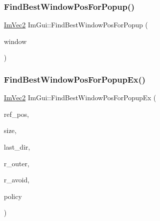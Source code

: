 \subsubsection{\texorpdfstring{Find\+Best\+Window\+Pos\+For\+Popup()}{FindBestWindowPosForPopup()}}
{\footnotesize\ttfamily \hyperlink{structImVec2}{Im\+Vec2} Im\+Gui\+::\+Find\+Best\+Window\+Pos\+For\+Popup (\begin{DoxyParamCaption}\item[{\hyperlink{structImGuiWindow}{Im\+Gui\+Window} $\ast$}]{window }\end{DoxyParamCaption})}

\mbox{\label{namespaceImGui_ab4a820eead6cd418d7be66e142bf3478}} 
\subsubsection{\texorpdfstring{Find\+Best\+Window\+Pos\+For\+Popup\+Ex()}{FindBestWindowPosForPopupEx()}}
{\footnotesize\ttfamily \hyperlink{structImVec2}{Im\+Vec2} Im\+Gui\+::\+Find\+Best\+Window\+Pos\+For\+Popup\+Ex (\begin{DoxyParamCaption}\item[{const \hyperlink{structImVec2}{Im\+Vec2} \&}]{ref\+\_\+pos,  }\item[{const \hyperlink{structImVec2}{Im\+Vec2} \&}]{size,  }\item[{Im\+Gui\+Dir $\ast$}]{last\+\_\+dir,  }\item[{const \hyperlink{structImRect}{Im\+Rect} \&}]{r\+\_\+outer,  }\item[{const \hyperlink{structImRect}{Im\+Rect} \&}]{r\+\_\+avoid,  }\item[{\hyperlink{imgui__internal_8h_a9c122103feadc7b225fc21698ff0f4d8}{Im\+Gui\+Popup\+Position\+Policy}}]{policy }\end{DoxyParamCaption})}

\mbox{\label{namespaceImGui_acbee71305d643afa7020759bc97feaf2}} 

